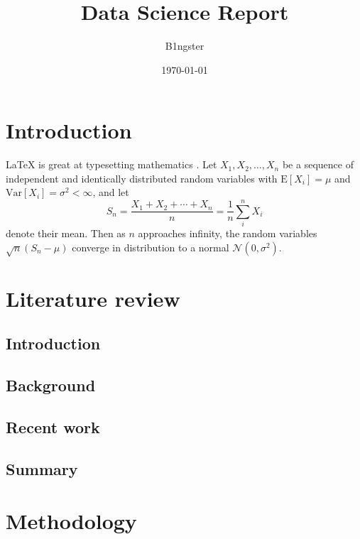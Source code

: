 \documentclass{article}
\title{Data Science Report }
\author{B1ngster}
\date{\today}
\begin{document}
\maketitle
\newpage

\begin{abstract}

\end{abstract}


\newpage
\tableofcontents
\newpage


 \section{Introduction}

\cite{einstein}


\LaTeX{} is great at typesetting mathematics \cite{einstein}. Let $X_1, X_2, \ldots, X_n$ be a sequence of independent and identically distributed random variables with $\text{E}[X_i] = \mu$ and $\text{Var}[X_i] = \sigma^2 < \infty$, and let
$$S_n = \frac{X_1 + X_2 + \cdots + X_n}{n}
      = \frac{1}{n}\sum_{i}^{n} X_i$$
denote their mean. Then as $n$ approaches infinity, the random variables $\sqrt{n}(S_n - \mu)$ converge in distribution to a normal $\mathcal{N}(0, \sigma^2)$.
\newpage

\section{Literature review} %
    \subsection{Introduction}
	
	
	\subsection{Background}

	\subsection{Recent work}
	\subsection{Summary}


\section{Methodology} 
\end{document}
